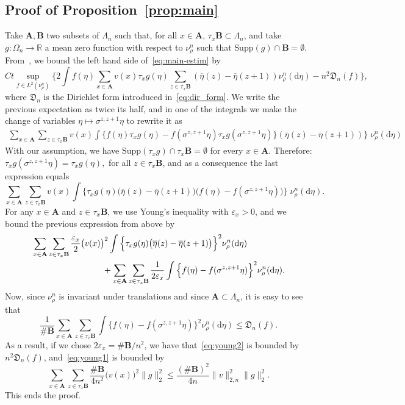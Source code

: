 \documentclass[10pt]{amsart}
\theoremstyle{definition}\newtheorem{defi}[theo]{Definition}\newtheorem{rema}[theo]{Remark}\newtheorem{exam}[theo]{Example}\newtheorem{exem}[theo]{Example}\newtheorem{nota}[theo]{Notation}
\newcommand{\bfA}{\mathbf{A}}
\newcommand{\bfB}{\mathbf{B}}
\newcommand{\bb}[1]{{\mathbb #1}}
\renewcommand{\bar}{\overline}
\renewcommand{\leq}{\leqslant}
\newcommand*{\dd}{\mathrm{d}}
\begin{document}
\subsection{Proof of Proposition~\ref{prop:main}}\label{ssec:proof}
Take $\bfA, \bfB$ two subsets of $\Lambda_n$ such that, for all $x\in\bfA$, $\tau_x{\bfB} \subset \Lambda_n$, and take $g:\Omega_n\to\bb R$ a mean zero function with respect to $\nu^n_\rho$ such that $\mathrm{Supp}(g)\cap {\bfB} = \emptyset$. From~\cite[Lemma~2.4]{KLO}, we bound the left hand side of~\eqref{eq:main-estim} by
\begin{equation*}
Ct\sup_{f\in L^2(\nu^n_\rho)} \bigg\{ 2 \int f(\eta) \sum_{x\in\bfA} v(x) \tau_x g(\eta) \sum_{z \in \tau_x \bfB} (\bar\eta(z)-\bar\eta(z+1)) \nu^n_\rho(\dd\eta) - n^2\mathfrak D_n(f)\bigg\},\label{eq:vari}
\end{equation*}
where $\mathfrak D_n$ is the Dirichlet form introduced in~\eqref{eq:dir_form}. We write the previous expectation as twice its half, and in one of the integrals we make the change of variables $\eta \mapsto \sigma^{z,z+1}\eta$ to rewrite it as
\begin{align*}\label{eq:sumint}
\sum_{x\in\bfA} \sum_{z\in\tau_x \bfB}v(x) \int \Big\{f(\eta) \tau_xg(\eta)- f(\sigma^{z,z+1}\eta) \tau_xg(\sigma^{z,z+1}\eta)\Big\} (\bar\eta(z)-\bar\eta(z+1)) \Big\}\; \nu^n_\rho(\dd\eta)
\end{align*}
With our assumption, we have $\mathrm{Supp}(\tau_xg) \cap \tau_x {\bfB} = \emptyset$ for every $x \in \bfA$. Therefore: $ \tau_xg(\sigma^{z,z+1}\eta)=\tau_x g(\eta),$ for all $z\in\tau_x{\bfB}$, and as a consequence the last expression equals
\begin{equation*}
\sum_{x\in\bfA} \sum_{z \in \tau_x \bfB}v(x) \int \Big\{ \tau_x g(\eta) \big(\bar\eta(z)-\bar\eta(z+1)\big) \big(f(\eta)-f(\sigma^{z,z+1}\eta)\big) \Big\}\; \nu^n_\rho(\dd\eta).
\end{equation*}
For any $x\in\bfA$ and $z\in\tau_x\bfB$, we use Young's inequality with $\varepsilon_x >0$, and we bound the previous expression from above by
\begin{align}
& \sum_{x\in\bfA} \sum_{z\in\tau_x\bfB}\frac{\varepsilon_x}{2} \big(v(x)\big)^2 \int \Big\{\tau_x g(\eta)\big(\bar\eta(z)-\bar\eta(z+1)\big)\Big\}^2 \nu^n_\rho(\dd\eta) \label{eq:young1}
\\
&\mkern 150mu+ \sum_{x\in\bfA}\sum_{z\in\tau_x\bfB} \frac{1}{2\varepsilon_x} \int \Big\{f(\eta)-f(\sigma^{z,z+1}\eta)\Big\}^2 \nu^n_\rho(\dd\eta). \label{eq:young2}
\end{align}
Now, since $\nu^n_\rho$ is invariant under translations and since ${\bfA}\subset \Lambda_n$, it is easy to see that
\[
\frac{1}{\#\bfB}\sum_{x\in\bfA}\sum_{z\in\tau_x\bfB} \int \Big\{f(\eta)-f(\sigma^{z,z+1}\eta)\Big\}^2 \nu^n_\rho(\dd\eta) \leq \mathfrak D_n(f).
\]
As a result, if we chose $2\varepsilon_x = \#{\bfB}/ n^2$, we have that~\eqref{eq:young2} is bounded by $n^2 \mathfrak D_n(f)$, and~\eqref{eq:young1} is bounded by
\[
\sum_{x\in\bfA} \sum_{z\in\tau_x\bfB} \frac{\#\bfB}{4n^2}\big(v(x)\big)^2 \|g\|_2^2 \leq \frac{(\#{\bfB})^2}{4n} \|v\|_{2,n}^2 \|g\|_2^2.
\]
This ends the proof.
\end{document}
